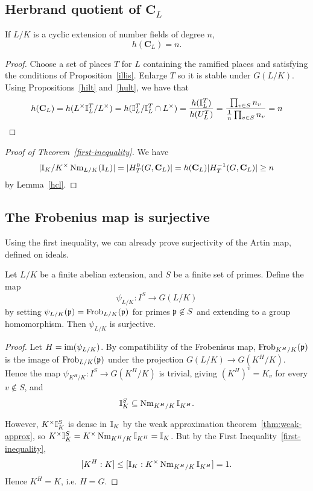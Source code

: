 \subsection{Herbrand quotient of $\mathbf C_L$}

\begin{lem}
If $L/K$ is a cyclic extension of number fields of degree $n$,
\[h(\mathbf C_L)=n.\]
\end{lem}
\begin{proof}
Choose a set of places $T$ for $L$ containing the ramified %
places and satisfying the conditions of Proposition~\ref{illis}. Enlarge $T$ so it is stable under $G(L/K)$. %
Using Propositions~\ref{hilt} and~\ref{hult}, we have that
\[
h(\mathbf C_L)=h(L^{\times}\mathbb{I}_L^T/L^{\times})
=h(\mathbb{I}_L^T/\mathbb{I}_L^T\cap L^{\times})=\frac{h(\mathbb{I}_L^T)}{h(U_L^T)}=\frac{\prod_{v\in S} n_v}{\frac{1}{n}\prod_{v\in S} n_v}=n
\]
\end{proof}
\begin{proof}[Proof of Theorem~\ref{first-inequality}]
We have
\[
|\mathbb{I}_K/K^{\times} \operatorname{Nm}_{L/K}(\mathbb{I}_L)|=|H_T^0(G,\mathbf C_L)|
=h(\mathbf C_L)|H_T^{-1}(G,\mathbf C_L)|\ge n
\]
by Lemma~\ref{hcl}.
\end{proof}
\subsection{The Frobenius map is surjective}
Using the first inequality, we can already prove surjectivity of the Artin map, defined on ideals.
\begin{pr}
Let $L/K$ be a finite abelian extension, and $S$ be a finite set of primes. Define the map
\[
\psi_{L/K}:I^S\to G(L/K)
\]
by setting $\psi_{L/K}(\mathfrak{p})=\operatorname{Frob}_{L/K}(\mathfrak{p})$ for primes $\mathfrak{p}\not\in S$ and extending to a group homomorphism. Then $\psi_{L/K}$ is surjective.
\end{pr}
\begin{proof}
Let $H=\text{im}(\psi_{L/K})$. By compatibility of the Frobenisus map, $\operatorname{Frob}_{K^H/K}(\mathfrak{p})$ is the image of $\operatorname{Frob}_{L/K}(\mathfrak{p})$ under the projection $G(L/K)\to G(K^H/K)$. Hence the map $\psi_{K^H/K}:I^S\to G(K^H/K)$ is trivial, giving $(K^H)^v=K_v$ for every $v\nin S$, and
\[
\mathbb{I}_K^S\subseteq \operatorname{Nm}_{K^H/K}\mathbb{I}_{K^H}.
\]

However, $K^{\times}\mathbb{I}_K^S$ is dense in $\mathbb{I}_K$ by the weak approximation theorem~\ref{thm:weak-approx}, so $K^{\times}\mathbb{I}_K^S= K^{\times}\operatorname{Nm}_{K^H/K}\mathbb{I}_{K^H}=\mathbb{I}_K$. But by the First Inequality~\ref{first-inequality}, 
\[[K^H:K]\le [\mathbb{I}_K:K^{\times}\operatorname{Nm}_{K^H/K}\mathbb{I}_{K^H}]=1.\]
Hence $K^H=K$, i.e. $H=G$. 
\end{proof}
